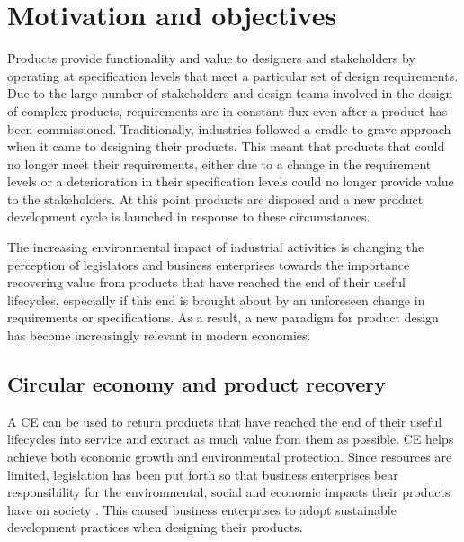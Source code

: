 \section{Motivation and objectives}
\label{sec:motivation}

Products provide functionality and value to designers and stakeholders by operating at specification levels that meet a particular set of design requirements. Due to the large number of stakeholders and design teams involved in the design of complex products, requirements are in constant flux even after a product has been commissioned. Traditionally, industries followed a cradle-to-grave approach when it came to designing their products. This meant that products that could no longer meet their requirements, either due to a change in the requirement levels or a deterioration in their specification levels could no longer provide value to the stakeholders. At this point products are disposed and a new product development cycle is launched in response to these circumstances.

The increasing environmental impact of industrial activities is changing the perception of legislators and business enterprises towards the importance recovering value from products that have reached the end of their useful lifecycles, especially if this end is brought about by an unforeseen change in requirements or specifications. As a result, a new paradigm for product design has become increasingly relevant in modern economies.

\subsection{Circular economy and product recovery} \label{subsec:CE}

A \ac{CE} can be used to return products that have reached the end of their useful lifecycles into service and extract as much value from them as possible. \ac{CE} helps achieve both economic growth and environmental protection. Since resources are limited, legislation has been put forth so that business enterprises bear responsibility for the environmental, social and economic impacts their products have on society \cite{Matos2007}. This caused business enterprises to adopt sustainable development practices when designing their products.

